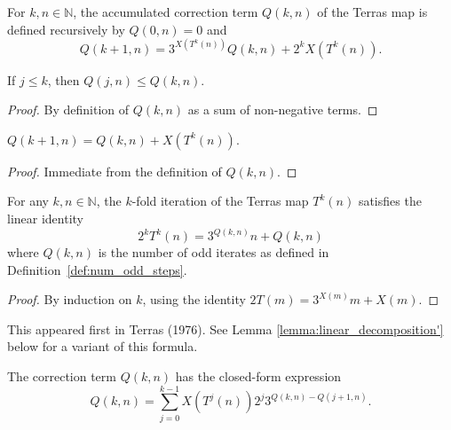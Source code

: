 \begin{definition}\label{def:decomposition_correction}\leanok
For $k, n \in \mathbb{N}$, the accumulated correction term $Q(k, n)$ of the Terras map is defined recursively by $Q(0, n) = 0$ and
\begin{equation}
    Q(k+1, n) = 3^{X(T^k(n))} Q(k, n) + 2^k X(T^k(n)).
\end{equation}
\end{definition}

\begin{lemma}\label{lemma:num_odd_steps_mono}\leanok
If $j \le k$, then $Q(j, n) \le Q(k, n)$.
\end{lemma}
\begin{proof}\leanok
By definition of $Q(k, n)$ as a sum of non-negative terms.
\end{proof}

\begin{lemma}\label{lemma:num_odd_steps_succ}\leanok
$Q(k+1, n) = Q(k, n) + X(T^k(n))$.
\end{lemma}
\begin{proof}\leanok
Immediate from the definition of $Q(k, n)$.
\end{proof}

\begin{lemma}\label{lemma:linear_decomposition}\leanok
For any $k, n \in \mathbb{N}$, the $k$-fold iteration of the Terras map $T^k(n)$ satisfies the linear identity
\begin{equation}
    2^k T^k(n) = 3^{Q(k, n)} n + Q(k, n)
\end{equation}
where $Q(k, n)$ is the number of odd iterates as defined in Definition~\ref{def:num_odd_steps}.
\end{lemma}
\begin{proof}\leanok
By induction on $k$, using the identity $2 T(m) = 3^{X(m)} m + X(m)$.
\end{proof}
This appeared first in Terras (1976)\cite{terras76}. See Lemma \ref{lemma:linear_decomposition'}
below for a variant of this formula.

\begin{definition}\label{def:decomposition_correction_sum}\leanok
The correction term $Q(k, n)$ has the closed-form expression
\begin{equation}
    Q(k, n) = \sum_{j=0}^{k-1} X(T^j(n)) 2^j 3^{Q(k, n) - Q(j+1, n)}.
\end{equation}
\end{definition}

